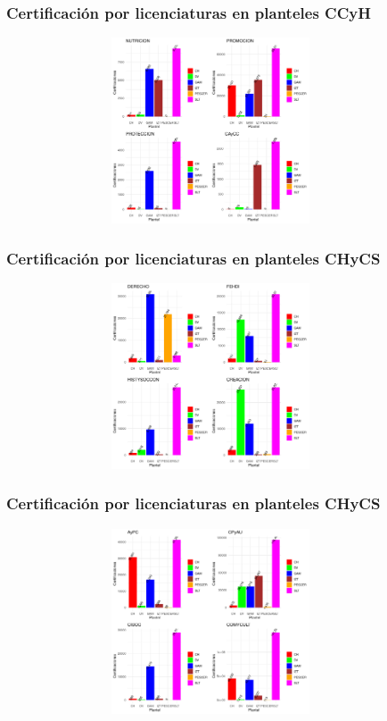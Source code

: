 \documentclass[xcolor=dvipsnames]{beamer}
\begin{document}
\begin{frame}\frametitle{Certificaci\'on por licenciaturas en planteles CCyH}
\begin{figure}[H]
\centering
\includegraphics[width=10cm,height=5.5cm]{Imagenes/GraficasCertificacionLicenciaturas3.pdf}
\end{figure}
\end{frame}

\begin{frame}\frametitle{Certificaci\'on por licenciaturas en planteles CHyCS}
\begin{figure}[H]
\centering
\includegraphics[width=10cm,height=5.5cm]{Imagenes/GraficasCertificacionLicenciaturas4.pdf}
\end{figure}
\end{frame}

\begin{frame}\frametitle{Certificaci\'on por licenciaturas en planteles CHyCS}
\begin{figure}[H]
\centering
\includegraphics[width=10cm,height=5.5cm]{Imagenes/GraficasCertificacionLicenciaturas5.pdf}
\end{figure}
\end{frame}
\end{document}
